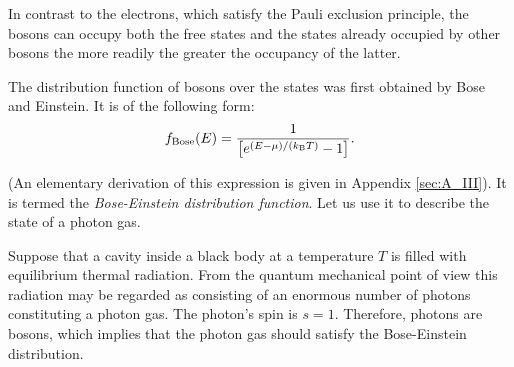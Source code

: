In contrast to the electrons, which satisfy the Pauli exclusion principle, the bosons can occupy both the free states and the states already occupied by other bosons the more readily the greater the occupancy of the latter.

The distribution function of bosons over the states was first obtained by Bose and Einstein. It is of the following form:
\begin{equation}\label{eq:3_50}
    f_{\text{Bose}}(E) = \frac{1}{\left[e^{(E-\mu)/(k_{\text{B}}T)} - 1\right]}.
\end{equation}

\noindent
(An elementary derivation of this expression is given in Appendix \ref{sec:A_III}). It is termed the \textit{Bose-Einstein distribution function}. Let us use it to describe the state of a photon gas.

Suppose that a cavity inside a black body at a temperature $T$ is filled with equilibrium thermal radiation. From the quantum mechanical point of view this radiation may be regarded as consisting of an enormous number of photons constituting a photon gas. The photon's spin is $s=1$. Therefore, photons are bosons, which implies that the photon gas should satisfy the Bose-Einstein distribution.

